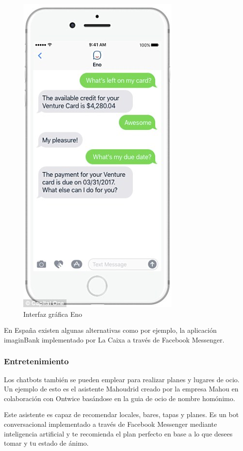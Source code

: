 \begin{figure}[H]
    \centering
    \includegraphics[scale=0.3]{include/figuras/Eno.jpg}
    \caption{Interfaz gráfica Eno}
    \label{fig:eno}
\end{figure}


En España existen algunas alternativas como por ejemplo, la aplicación imaginBank implementado por La Caixa a través de Facebook Messenger.

\subsubsection{Entretenimiento}
Los chatbots también se pueden emplear para realizar planes y lugares de ocio. Un ejemplo de esto es el asistente Mahoudrid creado por la empresa Mahou en colaboración con Ontwice basándose en la guia de ocio de nombre homónimo. 

Este asistente es capaz de recomendar locales, bares, tapas y planes. Es un bot conversacional implementado a través de Facebook Messenger mediante inteligencia artificial y te recomienda el plan perfecto en base a lo que desees tomar y tu estado de ánimo. 

